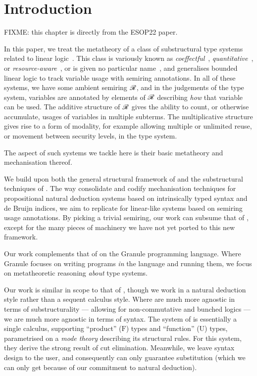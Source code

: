 \chapter{Introduction}

FIXME: this chapter is directly from the ESOP22 paper.

In this paper, we treat the metatheory of a class of substructural type
systems related to linear logic~\cite{girard87linear}.
This class is variously known as
\emph{coeffectful}~\cite{PetricekOM14,Granule18},
\emph{quantitative}~\cite{BrunelGMZ14,Atkey18}, or
\emph{resource-aware}~\cite{GhicaS14},
or is given no particular name~\cite{reed10distance,abadi99core},
and generalises bounded linear logic to track variable usage with semiring
annotations.
In all of these systems, we have some ambient semiring $\mathscr R$, and in the
judgements of the type system, variables are annotated by elements of $\mathscr R$
describing \emph{how} that variable can be used.
The additive structure of $\mathscr R$ gives the ability to count, or otherwise
accumulate, usages of variables in multiple subterms.
The multiplicative structure gives rise to a form of modality, for example
allowing multiple or unlimited reuse, or movement between security levels, in
the type system.

The aspect of such systems we tackle here is their basic metatheory and
mechanisation thereof.

We build upon both the general structural framework of
\citet{AACMM21} and the substructural techniques of \citet{WA20}.
The way \citeauthor{AACMM21} consolidate and codify mechanisation techniques for
propositional natural deduction systems based on intrinsically typed syntax and
de Bruijn indices, we aim to replicate for linear-like systems based on
semiring usage annotations.
By picking a trivial semiring, our work can subsume that of
\citeauthor{AACMM21}, except for the many pieces of machinery we have not yet
ported to this new framework.

Our work complements that of \citet{Granule18} on the Granule programming
language.
Where Granule focuses on writing programs \emph{in} the language and running
them, we focus on metatheoretic reasoning \emph{about} type systems.

Our work is similar in scope to that of \citet{LicataSR17}, though we work in
a natural deduction style rather than a sequent calculus style.
Where \citeauthor{LicataSR17} are much more agnostic in terms of
substructurality --- allowing for non-commutative and bunched logics ---
we are much more agnostic in terms of syntax.
The system of \citeauthor{LicataSR17} is essentially a single calculus,
supporting ``product'' ($\mathrm F$) types and ``function'' ($\mathrm U$)
types, parametrised on a \emph{mode theory} describing its structural rules.
For this system, they derive the strong result of cut elimination.
Meanwhile, we leave syntax design to the user, and consequently can only
guarantee substitution (which we can only get because of our commitment to
natural deduction).

